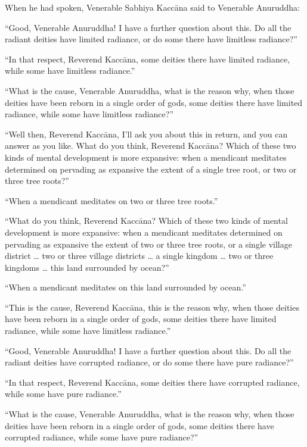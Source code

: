 \documentclass[12pt,openany]{book}%
\begin{document}
When he had spoken, Venerable Sabhiya \textsanskrit{Kaccāna} said to Venerable Anuruddha: 

“Good, Venerable Anuruddha! I have a further question about this. Do all the radiant deities have limited radiance, or do some there have limitless radiance?” 

“In that respect, Reverend \textsanskrit{Kaccāna}, some deities there have limited radiance, while some have limitless radiance.” 

“What is the cause, Venerable Anuruddha, what is the reason why, when those deities have been reborn in a single order of gods, some deities there have limited radiance, while some have limitless radiance?” 

“Well then, Reverend \textsanskrit{Kaccāna}, I’ll ask you about this in return, and you can answer as you like. What do you think, Reverend \textsanskrit{Kaccāna}? Which of these two kinds of mental development is more expansive: when a mendicant meditates determined on pervading as expansive the extent of a single tree root, or two or three tree roots?” 

“When a mendicant meditates on two or three tree roots.” 

“What do you think, Reverend \textsanskrit{Kaccāna}? Which of these two kinds of mental development is more expansive: when a mendicant meditates determined on pervading as expansive the extent of two or three tree roots, or a single village district … two or three village districts … a single kingdom … two or three kingdoms … this land surrounded by ocean?” 

“When a mendicant meditates on this land surrounded by ocean.” 

“This is the cause, Reverend \textsanskrit{Kaccāna}, this is the reason why, when those deities have been reborn in a single order of gods, some deities there have limited radiance, while some have limitless radiance.” 

“Good, Venerable Anuruddha! I have a further question about this. Do all the radiant deities have corrupted radiance, or do some there have pure radiance?” 

“In that respect, Reverend \textsanskrit{Kaccāna}, some deities there have corrupted radiance, while some have pure radiance.” 

“What is the cause, Venerable Anuruddha, what is the reason why, when those deities have been reborn in a single order of gods, some deities there have corrupted radiance, while some have pure radiance?” 
\end{document}
